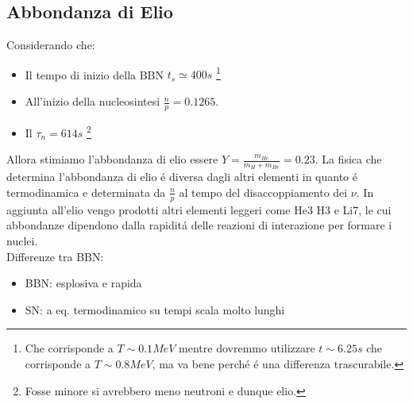 \documentclass[12pt, a4paper]{article}
\begin{document}
\subsection{Abbondanza di Elio}
Considerando che:
\begin{itemize}
    \item Il tempo di inizio della BBN $t_s\simeq 400 s$ \footnote{Che corrisponde a $T\sim0.1 MeV$ mentre dovremmo utilizzare $t\sim 6.25 s$ che corrisponde a $T\sim0.8 MeV$, ma va bene perch\'{e} \'{e} una differenza trascurabile.}
    \item All'inizio della nucleosintesi $\frac{n}{p}=0.1265$.
    \item Il $\tau_n = 614s$ \footnote{Fosse minore si avrebbero meno neutroni e dunque elio.}
\end{itemize}
Allora stimiamo l'abbondanza di elio essere $Y=\frac{m_{He}}{m_H+m_{He}}=0.23$. La fisica che determina l'abbondanza di elio \'{e} diversa dagli altri elementi in quanto \'{e} termodinamica e determinata da $\frac{n}{p}$ al tempo del disaccoppiamento dei $\nu$. In aggiunta all'elio vengo prodotti altri elementi leggeri come He3 H3 e Li7, le cui abbondanze dipendono dalla rapidit\'{a} delle reazioni di interazione per formare i nuclei.\\
Differenze tra BBN:
\begin{itemize}
    \item BBN: esplosiva e rapida
    \item SN: a eq. termodinamico su tempi scala molto lunghi
\end{itemize}
\end{document}

